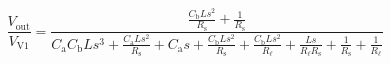 \begin{equation}
\frac{V_{\mathrm{out}}}{V_{\mathrm{V1}}} = \frac{\frac{C_{\mathrm{b}} L s^{2}}{R_{\mathrm{s}}} + \frac{1}{R_{\mathrm{s}}}}{C_{\mathrm{a}} C_{\mathrm{b}} L s^{3} + \frac{C_{\mathrm{a}} L s^{2}}{R_{\mathrm{s}}} + C_{\mathrm{a}} s + \frac{C_{\mathrm{b}} L s^{2}}{R_{\mathrm{s}}} + \frac{C_{\mathrm{b}} L s^{2}}{R_{\ell}} + \frac{L s}{R_{\ell} R_{\mathrm{s}}} + \frac{1}{R_{\mathrm{s}}} + \frac{1}{R_{\ell}}}
\end{equation}

